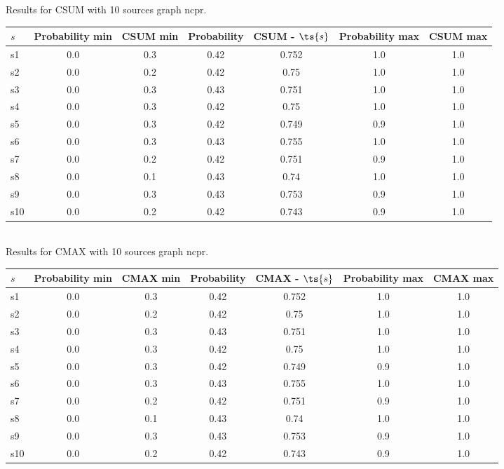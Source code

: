 \documentclass{article}
\begin{document}
\noindent Results for CSUM with 10 sources graph ncpr.

\noindent\begin{tabular}{|l|c|c|c|c|c|c|}
\hline
$s$& Probability min & CSUM min & Probability & CSUM - $\ts{s}$ & Probability max & CSUM max\\
\hline
s1 &0.0 & 0.3 & 0.42 & 0.752 & 1.0 & 1.0\\
\hline
s2 &0.0 & 0.2 & 0.42 & 0.75 & 1.0 & 1.0\\
\hline
s3 &0.0 & 0.3 & 0.43 & 0.751 & 1.0 & 1.0\\
\hline
s4 &0.0 & 0.3 & 0.42 & 0.75 & 1.0 & 1.0\\
\hline
s5 &0.0 & 0.3 & 0.42 & 0.749 & 0.9 & 1.0\\
\hline
s6 &0.0 & 0.3 & 0.43 & 0.755 & 1.0 & 1.0\\
\hline
s7 &0.0 & 0.2 & 0.42 & 0.751 & 0.9 & 1.0\\
\hline
s8 &0.0 & 0.1 & 0.43 & 0.74 & 1.0 & 1.0\\
\hline
s9 &0.0 & 0.3 & 0.43 & 0.753 & 0.9 & 1.0\\
\hline
s10 &0.0 & 0.2 & 0.42 & 0.743 & 0.9 & 1.0\\
\hline
\end{tabular}\\

\noindent Results for CMAX with 10 sources graph ncpr.

\noindent\begin{tabular}{|l|c|c|c|c|c|c|}
\hline
$s$& Probability min & CMAX min & Probability & CMAX - $\ts{s}$ & Probability max & CMAX max\\
\hline
s1 &0.0 & 0.3 & 0.42 & 0.752 & 1.0 & 1.0\\
\hline
s2 &0.0 & 0.2 & 0.42 & 0.75 & 1.0 & 1.0\\
\hline
s3 &0.0 & 0.3 & 0.43 & 0.751 & 1.0 & 1.0\\
\hline
s4 &0.0 & 0.3 & 0.42 & 0.75 & 1.0 & 1.0\\
\hline
s5 &0.0 & 0.3 & 0.42 & 0.749 & 0.9 & 1.0\\
\hline
s6 &0.0 & 0.3 & 0.43 & 0.755 & 1.0 & 1.0\\
\hline
s7 &0.0 & 0.2 & 0.42 & 0.751 & 0.9 & 1.0\\
\hline
s8 &0.0 & 0.1 & 0.43 & 0.74 & 1.0 & 1.0\\
\hline
s9 &0.0 & 0.3 & 0.43 & 0.753 & 0.9 & 1.0\\
\hline
s10 &0.0 & 0.2 & 0.42 & 0.743 & 0.9 & 1.0\\
\hline
\end{tabular}\\
\end{document}
